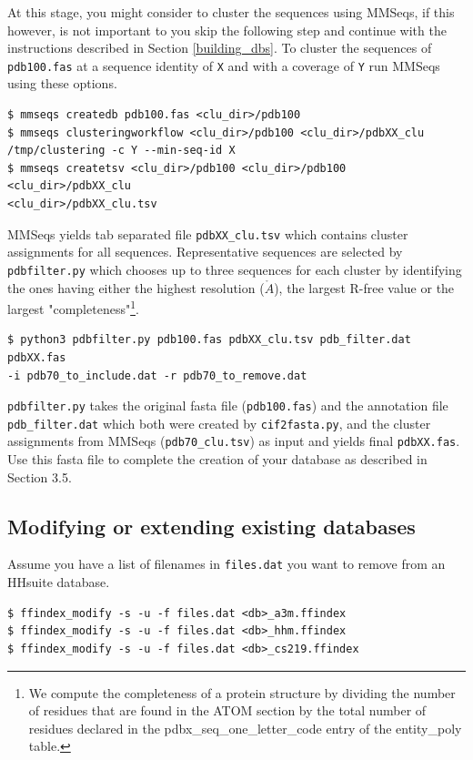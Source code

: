 \documentclass[11pt,a4paper]{article}
\begin{document}
At this stage, you might consider to cluster the sequences using MMSeqs, if this however, is not important to you skip the following step and continue with the instructions described in Section \ref{building_dbs}. To cluster the sequences of \verb`pdb100.fas` at a sequence identity of \verb`X` and with a coverage of \verb`Y` run MMSeqs using these options.

\begin{verbatim}
$ mmseqs createdb pdb100.fas <clu_dir>/pdb100
$ mmseqs clusteringworkflow <clu_dir>/pdb100 <clu_dir>/pdbXX_clu 
/tmp/clustering -c Y --min-seq-id X
$ mmseqs createtsv <clu_dir>/pdb100 <clu_dir>/pdb100 <clu_dir>/pdbXX_clu 
<clu_dir>/pdbXX_clu.tsv
\end{verbatim}

MMSeqs yields tab separated file \verb`pdbXX_clu.tsv` which contains cluster assignments for all sequences. Representative sequences are selected by \verb`pdbfilter.py` which chooses up to three sequences for each cluster by identifying the ones having either the highest resolution ($\mathring{A}$), the largest R-free value or the largest "completeness"\footnote{We compute the completeness of a protein structure by dividing the number of residues that are found in the ATOM section by the total number of residues declared in the pdbx\_seq\_one\_letter\_code entry of the entity\_poly table.}. 

\begin{verbatim}
$ python3 pdbfilter.py pdb100.fas pdbXX_clu.tsv pdb_filter.dat pdbXX.fas 
-i pdb70_to_include.dat -r pdb70_to_remove.dat
\end{verbatim}

\verb`pdbfilter.py` takes the original fasta file (\verb`pdb100.fas`) and the annotation file \verb`pdb_filter.dat` which both were created by \verb`cif2fasta.py`, and the cluster assignments from MMSeqs (\verb`pdb70_clu.tsv`) as input and yields final \verb`pdbXX.fas`. Use this fasta file to complete the creation of your database as described in Section 3.5.

\subsection{Modifying or extending existing databases}

Assume you have a list of filenames in \verb`files.dat` you want to remove from an HHsuite database.

\begin{verbatim}
$ ffindex_modify -s -u -f files.dat <db>_a3m.ffindex
$ ffindex_modify -s -u -f files.dat <db>_hhm.ffindex
$ ffindex_modify -s -u -f files.dat <db>_cs219.ffindex
\end{verbatim}
\end{document}
